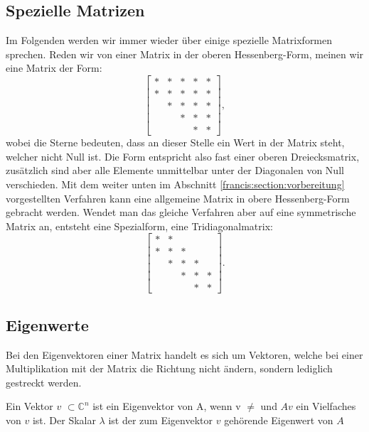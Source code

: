 \subsection{Spezielle Matrizen\label{francis:section:grundlagen:spezielle_matrizen}}
Im Folgenden werden wir immer wieder über einige spezielle Matrixformen sprechen.
Reden wir von einer Matrix in der oberen Hessenberg-Form, meinen wir eine Matrix der Form:
%
%
\begin{equation}
	\begin{bmatrix}
	* & * & * & * & * \\
	* & * & * & * & * \\
	& * & * & * & * \\
	&   & * & * & * \\
	&   &   & * & *
	\end{bmatrix},
\end{equation}
wobei die Sterne bedeuten, dass an dieser Stelle ein Wert in der Matrix steht, welcher nicht Null ist.
Die Form entspricht also fast einer oberen Dreiecksmatrix, zusätzlich sind aber alle Elemente unmittelbar unter der Diagonalen von Null verschieden.
Mit dem weiter unten im Abschnitt \ref{francis:section:vorbereitung} vorgestellten Verfahren kann eine allgemeine Matrix in obere Hessenberg-Form gebracht werden. Wendet man das gleiche Verfahren aber auf eine symmetrische Matrix an, entsteht eine Spezialform, eine Tridiagonalmatrix:
\begin{equation}
	\begin{bmatrix}
	* & * &   &   &   \\
	* & * & *  &   &   \\
	& * & * & * &  \\
	&   & * & * & * \\
	&   &   & * & *
	\end{bmatrix}.
\end{equation}

\subsection{Eigenwerte\label{francis:section:grundlagen:eigenwerte}}
Bei den Eigenvektoren einer Matrix handelt es sich um Vektoren, welche bei einer Multiplikation mit der Matrix die Richtung nicht ändern, sondern lediglich gestreckt werden.

\begin{satz}
	Ein Vektor $v$ $\subset \mathbb{C}^n$ ist ein Eigenvektor von A, wenn v $\neq$ und $Av$ ein Vielfaches von $v$ ist. Der Skalar $\lambda$ ist der zum Eigenvektor $v$ gehörende Eigenwert von $A$
\end{satz}

